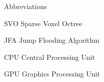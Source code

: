 \begin{dictionary}{Abbreviations}
    \item[SVO] Sparse Voxel Octree
    \item[JFA] Jump Flooding Algorithm
    \item[CPU] Central Processing Unit
    \item[GPU] Graphics Processing Unit
\end{dictionary}
